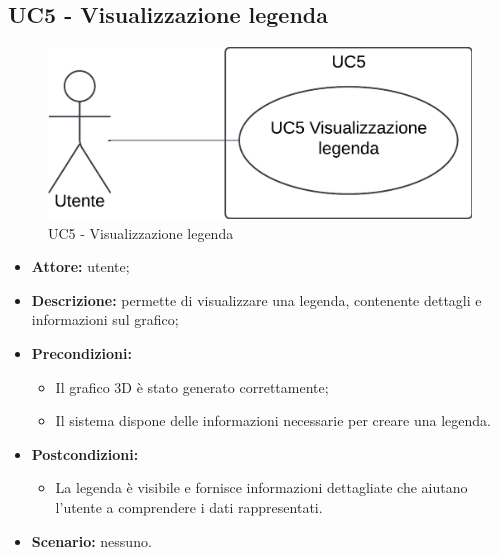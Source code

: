 \subsection{UC5 - Visualizzazione legenda}
\begin{figure}[h!]
    \centering
    \includegraphics[scale=0.7]{template/images/UC5.png}
    \caption{UC5 - Visualizzazione legenda}
\end{figure}
\begin{itemize}
    \item \textbf{Attore:} utente;
    \item \textbf{Descrizione:} permette di visualizzare una legenda, contenente dettagli e informazioni sul grafico;
    \item \textbf{Precondizioni:} 
    \begin{itemize}
        \item Il grafico 3D è stato generato correttamente;
        \item Il sistema dispone delle informazioni necessarie per creare una legenda.
    \end{itemize}
    \item \textbf{Postcondizioni:}
    \begin{itemize}
        \item La legenda è visibile e fornisce informazioni dettagliate che aiutano l'utente a comprendere i dati rappresentati.
    \end{itemize}
    \item \textbf{Scenario:} nessuno.
\end{itemize}
\newpage
